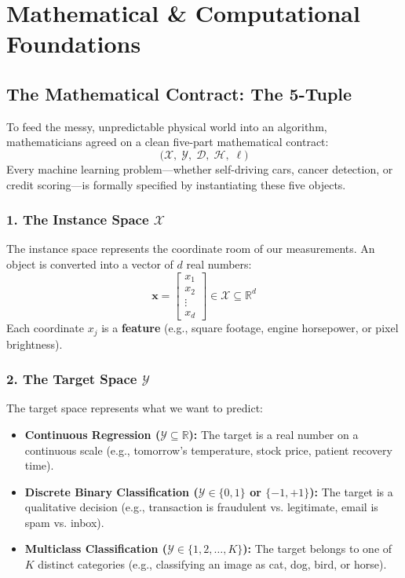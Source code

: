 \section{Mathematical \& Computational Foundations}

\subsection{The Mathematical Contract: The 5-Tuple}
To feed the messy, unpredictable physical world into an algorithm, mathematicians agreed on a clean five-part mathematical contract:
\begin{equation}
\Big( \mathcal{X}, \; \mathcal{Y}, \; \mathcal{D}, \; \mathcal{H}, \; \ell \Big)
\label{eq:five_tuple_contract}
\end{equation}
Every machine learning problem—whether self-driving cars, cancer detection, or credit scoring—is formally specified by instantiating these five objects.

\subsubsection{1. The Instance Space $\mathcal{X}$}
The instance space represents the coordinate room of our measurements. An object is converted into a vector of $d$ real numbers:
\begin{equation}
\mathbf{x} = \begin{bmatrix} x_1 \\ x_2 \\ \vdots \\ x_d \end{bmatrix} \in \mathcal{X} \subseteq \mathbb{R}^d
\end{equation}
Each coordinate $x_j$ is a \textbf{feature} (e.g., square footage, engine horsepower, or pixel brightness).

\subsubsection{2. The Target Space $\mathcal{Y}$}
The target space represents what we want to predict:
\begin{itemize}
    \item \textbf{Continuous Regression ($\mathcal{Y} \subseteq \mathbb{R}$):} The target is a real number on a continuous scale (e.g., tomorrow's temperature, stock price, patient recovery time).
    \item \textbf{Discrete Binary Classification ($\mathcal{Y} \in \{0, 1\}$ or $\{-1, +1\}$):} The target is a qualitative decision (e.g., transaction is fraudulent vs. legitimate, email is spam vs. inbox).
    \item \textbf{Multiclass Classification ($\mathcal{Y} \in \{1, 2, \dots, K\}$):} The target belongs to one of $K$ distinct categories (e.g., classifying an image as cat, dog, bird, or horse).
\end{itemize}

